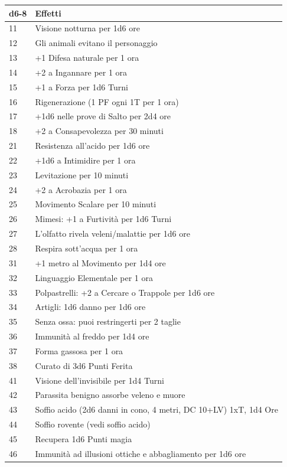 \begin{multicols}{2}
\noindent\begin{tabularx}{0.50\textwidth}{lX}
	\textbf{d6-8} & \textbf{Effetti}\\
	\toprule
11 & Visione notturna per 1d6 ore \\
12 & Gli animali evitano il personaggio \\
13 & +1 Difesa naturale per 1 ora \\
14 & +2 a Ingannare per 1 ora \\
15 & +1 a Forza per 1d6 Turni \\
16 & Rigenerazione (1 PF ogni 1T per 1 ora) \\
17 & +1d6 nelle prove di Salto per 2d4 ore\\
18 & +2 a Consapevolezza per 30 minuti \\
21 & Resistenza all'acido per 1d6 ore \\
22 & +1d6 a Intimidire per 1 ora \\
23 & Levitazione per 10 minuti \\
24 & +2 a Acrobazia per 1 ora \\
25 & Movimento Scalare per 10 minuti \\
26 & Mimesi: +1 a Furtività per 1d6 Turni\\
27 & L'olfatto rivela veleni/malattie per 1d6 ore \\
28 & Respira sott’acqua per 1 ora \\
31 & +1 metro al Movimento per 1d4 ore\\
32 & Linguaggio Elementale per 1 ora\\
33 & Polpastrelli: +2 a Cercare o Trappole per 1d6 ore\\
34 & Artigli: 1d6 danno per 1d6 ore\\
35 & Senza ossa: puoi restringerti per 2 taglie\\
36 & Immunità al freddo per 1d4 ore \\
37 & Forma gassosa per 1 ora\\
38 & Curato di 3d6 Punti Ferita\\
41 & Visione dell’invisibile per 1d4 Turni \\
42 & Parassita benigno assorbe veleno e muore \\
43 & Soffio acido (2d6 danni in cono, 4 metri, DC 10+LV) 1xT, 1d4 Ore\\
44 & Soffio rovente (vedi soffio acido)\\
45 & Recupera 1d6 Punti magia \\
46 & Immunità ad illusioni ottiche e abbagliamento per 1d6 ore\\

\end{tabularx}
\end{multicols}
